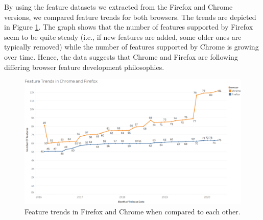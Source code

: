 By using the feature datasets we extracted from the Firefox and Chrome
versions, we compared feature trends for both browsers. The trends are
depicted in Figure \ref{fig:featuretrends}. The graph shows that the
  number of features supported by Firefox seem to be quite steady
  (i.e., if new features are added, some older ones are typically
  removed) while the number of features supported by Chrome is growing
  over time. Hence, the data suggests that Chrome and Firefox are
  following differing browser feature development philosophies.

\begin{figure}[ht]
    \centering
    \includegraphics[width=\columnwidth]{figures/Feature-Trends.PNG}
    \caption{Feature trends in Firefox and Chrome when compared to
      each other.}
    \label{fig:featuretrends}
\end{figure}
